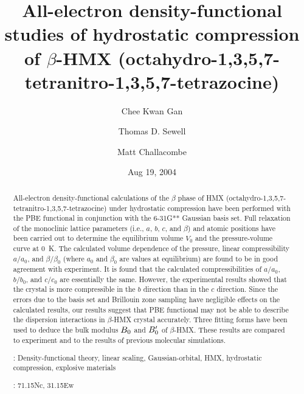 \commentoutA{\documentclass[prl,aps,twocolumn,twocolumngrid,superbib]{revtex4}}
\begin{document}
\title[Short Title]{
All-electron density-functional studies of 
hydrostatic compression of 
$\beta$-HMX (octahydro-1,3,5,7-tetranitro-1,3,5,7-tetrazocine)\footnotemark[1]}

\author{Chee Kwan Gan\footnotemark[2]}
\author{Thomas D. Sewell\footnotemark[3]}
\author{Matt Challacombe\footnotemark[4]}


\date{Aug 19, 2004}

\begin{abstract}
All-electron density-functional calculations of the $\beta$ phase of
HMX (octahydro-1,3,5,7-tetranitro-1,3,5,7-tetrazocine) under
hydrostatic compression have been performed with the PBE functional in
conjunction with the 6-31G** Gaussian basis set.  Full relaxation of
the monoclinic lattice parameters (i.e.,  $a$, $b$, $c$, and $\beta$)
and atomic positions have been carried out to determine the
equilibrium volume $V_0$ and the pressure-volume curve at 0~K.  The
calculated volume dependence of the pressure, linear compressibility
$a/a_0$, and $\beta/\beta_0$ (where $a_0$ and $\beta_0$ are values at
equilibrium) are found to be in good agreement with experiment.  It is
found that the calculated compressibilities of $a/a_0$, $b/b_0$, and
$c/c_0$ are essentially the same.  However, the experimental results
showed that the crystal is more compressible in the $b$ direction than
in the $c$ direction.  Since the errors due to the basis set and
Brillouin zone sampling have negligible effects on the calculated
results, our results suggest that PBE functional may not be able to
describe the dispersion interactions in $\beta$-HMX crystal
accurately. Three fitting forms have been used to deduce the bulk
modulus $B_0$ and ${B'_0}$ of $\beta$-HMX. These results are
compared to experiment and to the results of previous molecular
simulations.

\smallskip
{}:
Density-functional theory, linear scaling,
Gaussian-orbital, HMX, hydrostatic compression, explosive materials

: 71.15Nc, 31.15Ew
\end{abstract}
\maketitle
\end{document}
